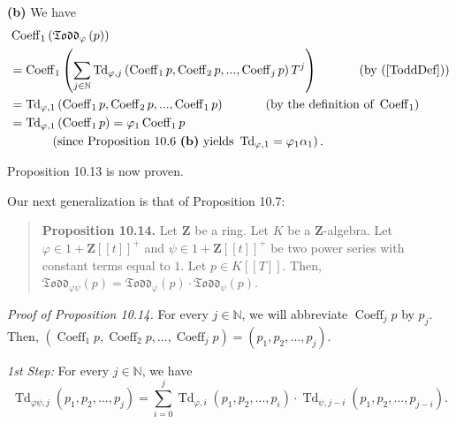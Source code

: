 \documentclass[numbers=enddot,12pt,final,onecolumn,notitlepage]{scrartcl}%
\begin{document}
\textbf{(b)} We have%
\begin{align*}
&  \operatorname*{Coeff}\nolimits_{1}\left(  \mathfrak{Todd}_{\varphi}\left(
p\right)  \right) \\
&  =\operatorname*{Coeff}\nolimits_{1}\left(  \sum_{j\in\mathbb{N}%
}\operatorname*{Td}\nolimits_{\varphi,j}\left(  \operatorname*{Coeff}%
\nolimits_{1}p,\operatorname*{Coeff}\nolimits_{2}p,...,\operatorname*{Coeff}%
\nolimits_{j}p\right)  T^{j}\right)  \ \ \ \ \ \ \ \ \ \ \left(  \text{by
(\ref{ToddDef})}\right) \\
&  =\operatorname*{Td}\nolimits_{\varphi,1}\left(  \operatorname*{Coeff}%
\nolimits_{1}p,\operatorname*{Coeff}\nolimits_{2}p,...,\operatorname*{Coeff}%
\nolimits_{1}p\right)  \ \ \ \ \ \ \ \ \ \ \left(  \text{by the definition of
}\operatorname*{Coeff}\nolimits_{1}\right) \\
&  =\operatorname*{Td}\nolimits_{\varphi,1}\left(  \operatorname*{Coeff}%
\nolimits_{1}p\right)  =\varphi_{1}\operatorname*{Coeff}\nolimits_{1}p\\
&  \ \ \ \ \ \ \ \ \ \ \left(  \text{since Proposition 10.6 \textbf{(b)}
yields }\operatorname*{Td}\nolimits_{\varphi,1}=\varphi_{1}\alpha_{1}\right)
.
\end{align*}


Proposition 10.13 is now proven.

Our next generalization is that of Proposition 10.7:

\begin{quote}
\textbf{Proposition 10.14.} Let $\mathbf{Z}$ be a ring. Let $K$ be a
$\mathbf{Z}$-algebra. Let $\varphi\in1+\mathbf{Z}\left[  \left[  t\right]
\right]  ^{+}$ and $\psi\in1+\mathbf{Z}\left[  \left[  t\right]  \right]
^{+}$ be two power series with constant terms equal to $1$. Let $p\in K\left[
\left[  T\right]  \right]  $. Then, $\mathfrak{Todd}_{\varphi\psi}\left(
p\right)  =\mathfrak{Todd}_{\varphi}\left(  p\right)  \cdot\mathfrak{Todd}%
_{\psi}\left(  p\right)  $.
\end{quote}

\textit{Proof of Proposition 10.14.} For every $j\in\mathbb{N}$, we will
abbreviate $\operatorname*{Coeff}\nolimits_{j}p$ by $p_{j}$. Then, $\left(
\operatorname*{Coeff}\nolimits_{1}p,\operatorname*{Coeff}\nolimits_{2}%
p,...,\operatorname*{Coeff}\nolimits_{j}p\right)  =\left(  p_{1}%
,p_{2},...,p_{j}\right)  $.

\textit{1st Step:} For every $j\in\mathbb{N}$, we have%
\[
\operatorname*{Td}\nolimits_{\varphi\psi,j}\left(  p_{1},p_{2},...,p_{j}%
\right)  =\sum\limits_{i=0}^{j}\operatorname*{Td}\nolimits_{\varphi,i}\left(
p_{1},p_{2},...,p_{i}\right)  \cdot\operatorname*{Td}\nolimits_{\psi
,j-i}\left(  p_{1},p_{2},...,p_{j-i}\right)  .
\]
\end{document}
